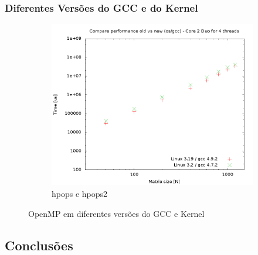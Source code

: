 \documentclass[a4paper, 12pt]{article}
\begin{document}
\newpage
\subsubsection{Diferentes Versões do GCC e do Kernel}
\begin{figure}[H]
    \centering
    \begin{subfigure}[H]{0.5\textwidth}
        \includegraphics[width=\textwidth]{compare_old_new_os}
        \caption{hpops e hpops2}
        \label{fig:hpops_hpops2}
    \end{subfigure}%
    \caption{OpenMP em diferentes versões do GCC e Kernel}\label{fig:animals}
\end{figure}
\subsection{Conclusões} \label{sec:dis}

%
%
\end{document}
